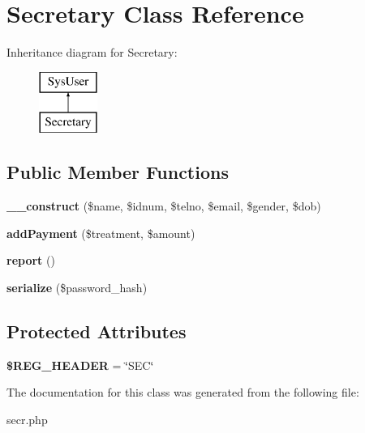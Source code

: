 \hypertarget{classSecretary}{\section{Secretary Class Reference}
\label{classSecretary}
}
Inheritance diagram for Secretary\-:\begin{figure}[H]
\begin{center}
\leavevmode
\includegraphics[height=2.000000cm]{classSecretary}
\end{center}
\end{figure}
\subsection*{Public Member Functions}
\begin{DoxyCompactItemize}
\item 
\hypertarget{classSecretary_a7ec89a34e195957310770d0de5569212}{{\bfseries \-\_\-\-\_\-construct} (\$name, \$idnum, \$telno, \$email, \$gender, \$dob)}\label{classSecretary_a7ec89a34e195957310770d0de5569212}

\item 
\hypertarget{classSecretary_aea8661b93979cb24de3baeb6e4c32446}{{\bfseries add\-Payment} (\$treatment, \$amount)}\label{classSecretary_aea8661b93979cb24de3baeb6e4c32446}

\item 
\hypertarget{classSecretary_a728b653a1b4c2cb87fa84d211368f113}{{\bfseries report} ()}\label{classSecretary_a728b653a1b4c2cb87fa84d211368f113}

\item 
\hypertarget{classSecretary_a65822fc6fec83036357012c85d453ed3}{{\bfseries serialize} (\$password\-\_\-hash)}\label{classSecretary_a65822fc6fec83036357012c85d453ed3}

\end{DoxyCompactItemize}
\subsection*{Protected Attributes}
\begin{DoxyCompactItemize}
\item 
\hypertarget{classSecretary_ab7068185aba36bce548c16da884aee29}{{\bfseries \$\-R\-E\-G\-\_\-\-H\-E\-A\-D\-E\-R} = \char`\"{}S\-E\-C\char`\"{}}\label{classSecretary_ab7068185aba36bce548c16da884aee29}

\end{DoxyCompactItemize}


The documentation for this class was generated from the following file\-:\begin{DoxyCompactItemize}
\item 
secr.\-php\end{DoxyCompactItemize}
